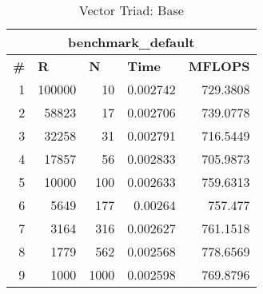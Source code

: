 \begin{table}[htbp]
	\centering
	\caption{Vector Triad: Base}
	\begin{tabular}{|r|r|r|r|r|}
		\toprule
		\multicolumn{5}{|c|}{\textbf{benchmark\_default   }} \\
		\midrule
		\multicolumn{1}{|l|}{\textbf{\#}} & \multicolumn{1}{l|}{\textbf{R}} & \multicolumn{1}{l|}{\textbf{N}} & \multicolumn{1}{l|}{\textbf{Time}} & \multicolumn{1}{l|}{\textbf{MFLOPS}} \\
		\midrule
		1                                 & 100000                          & 10                              & 0.002742                           & 729.3808                             \\
		\midrule
		2                                 & 58823                           & 17                              & 0.002706                           & 739.0778                             \\
		\midrule
		3                                 & 32258                           & 31                              & 0.002791                           & 716.5449                             \\
		\midrule
		4                                 & 17857                           & 56                              & 0.002833                           & 705.9873                             \\
		\midrule
		5                                 & 10000                           & 100                             & 0.002633                           & 759.6313                             \\
		\midrule
		6                                 & 5649                            & 177                             & 0.00264                            & 757.477                              \\
		\midrule
		7                                 & 3164                            & 316                             & 0.002627                           & 761.1518                             \\
		\midrule
		8                                 & 1779                            & 562                             & 0.002568                           & 778.6569                             \\
		\midrule
		9                                 & 1000                            & 1000                            & 0.002598                           & 769.8796                             \\

\end{tabular}
\end{table}
